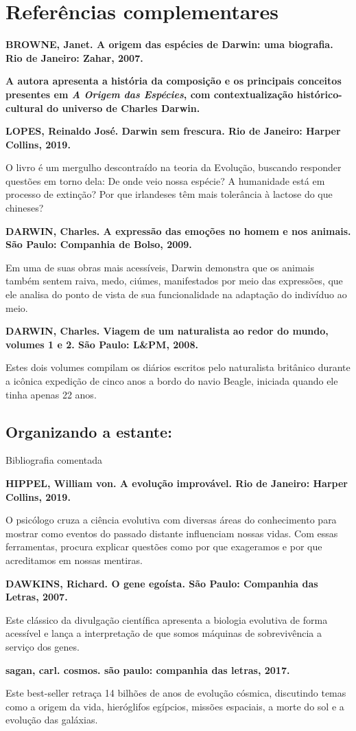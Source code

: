 \documentclass[12pt]{extarticle}
\begin{document}
\section{Referências complementares}

\textbf{BROWNE, Janet. A origem das espécies de Darwin: uma biografia.
Rio de Janeiro: Zahar, 2007.}

\textbf{A autora apresenta a história da composição e os principais
conceitos presentes em \emph{A Origem das Espécies}, com
contextualização histórico-cultural do universo de Charles Darwin.}

\textbf{LOPES, Reinaldo José. Darwin sem frescura. Rio de Janeiro:
Harper Collins, 2019.}

O livro é um mergulho descontraído na teoria da Evolução, buscando
responder questões em torno dela: De onde veio nossa espécie? A
humanidade está em processo de extinção? Por que irlandeses têm mais
tolerância à lactose do que chineses?

\textbf{DARWIN, Charles. A expressão das emoções no homem e nos animais.
São Paulo: Companhia de Bolso, 2009.}

Em uma de suas obras mais acessíveis, Darwin demonstra que os animais
também sentem raiva, medo, ciúmes, manifestados por meio das expressões,
que ele analisa do ponto de vista de sua funcionalidade na adaptação do
indivíduo ao meio.

\textbf{DARWIN, Charles. Viagem de um naturalista ao redor do mundo,
volumes 1 e 2. São Paulo: L\&PM, 2008.}

Estes dois volumes compilam os diários escritos pelo naturalista
britânico durante a icônica expedição de cinco anos a bordo do navio
Beagle, iniciada quando ele tinha apenas 22 anos.

\subsection{Organizando a estante:} Bibliografia comentada

\textbf{HIPPEL, William von. A evolução improvável. Rio de Janeiro:
Harper Collins, 2019.}

O psicólogo cruza a ciência evolutiva com diversas áreas do conhecimento
para mostrar como eventos do passado distante influenciam nossas vidas.
Com essas ferramentas, procura explicar questões como por que exageramos
e por que acreditamos em nossas mentiras.

\textbf{DAWKINS, Richard. O gene egoísta. São Paulo: Companhia das
Letras, 2007.}

Este clássico da divulgação científica apresenta a biologia evolutiva de
forma acessível e lança a interpretação de que somos máquinas de
sobrevivência a serviço dos genes.

\textbf{sagan, carl. cosmos. são paulo: companhia das letras, 2017.}

Este best-seller retraça 14 bilhões de anos de evolução cósmica,
discutindo temas como a origem da vida, hieróglifos egípcios, missões
espaciais, a morte do sol e a evolução das galáxias.
\end{document}
